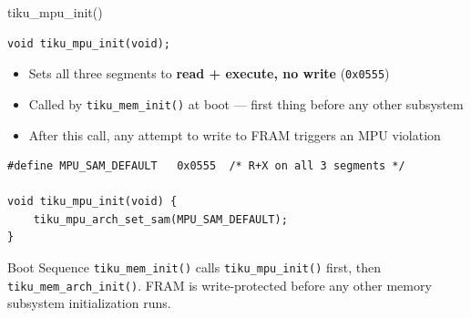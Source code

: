 \documentclass[aspectratio=169, 10pt]{beamer}
\begin{document}
\begin{frame}[fragile]{tiku\_mpu\_init()}
\begin{lstlisting}[style=cstyle]
void tiku_mpu_init(void);
\end{lstlisting}

\begin{itemize}
  \item Sets all three segments to \textbf{read + execute, no write} (\texttt{0x0555})
  \item Called by \texttt{tiku\_mem\_init()} at boot --- first thing before any other subsystem
  \item After this call, any attempt to write to FRAM triggers an MPU violation
\end{itemize}

\vspace{0.3em}
\begin{lstlisting}[style=cstyle, title={kernel/memory/tiku\_mpu.c}]
#define MPU_SAM_DEFAULT   0x0555  /* R+X on all 3 segments */

void tiku_mpu_init(void) {
    tiku_mpu_arch_set_sam(MPU_SAM_DEFAULT);
}
\end{lstlisting}

\vspace{0.3em}
\begin{block}{Boot Sequence}
\texttt{tiku\_mem\_init()} calls \texttt{tiku\_mpu\_init()} first, then
\texttt{tiku\_mem\_arch\_init()}. FRAM is write-protected before any
other memory subsystem initialization runs.
\end{block}
\end{frame}
\end{document}
